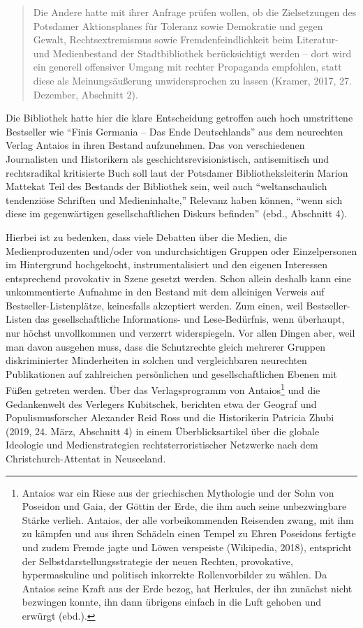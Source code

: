 \documentclass[a4paper,
fontsize=11pt,
oneside,
numbers=noperiodatend,
parskip=half-,
bibliography=totoc,
final
]{scrartcl}
\begin{document}
\begin{quote}
Die Andere hatte mit ihrer Anfrage prüfen wollen, ob die Zielsetzungen
des Potsdamer Aktionsplanes für Toleranz sowie Demokratie und gegen
Gewalt, Rechtsextremismus sowie Fremdenfeindlichkeit beim Literatur- und
Medienbestand der Stadtbibliothek berücksichtigt werden -- dort wird ein
generell offensiver Umgang mit rechter Propaganda empfohlen, statt diese
als Meinungsäußerung unwidersprochen zu lassen (Kramer, 2017, 27.
Dezember, Abschnitt 2).
\end{quote}

Die Bibliothek hatte hier die klare Entscheidung getroffen auch hoch
umstrittene Bestseller wie \enquote{Finis Germania -- Das Ende
Deutschlands} aus dem neurechten Verlag Antaios in ihren Bestand
aufzunehmen. Das von verschiedenen Journalisten und Historikern als
geschichtsrevisionistisch, antisemitisch und rechtsradikal kritisierte
Buch soll laut der Potsdamer Bibliotheksleiterin Marion Mattekat Teil
des Bestands der Bibliothek sein, weil auch \enquote{weltanschaulich
tendenziöse Schriften und Medieninhalte,} Relevanz haben können,
\enquote{wenn sich diese im gegenwärtigen gesellschaftlichen Diskurs
befinden} (ebd., Abschnitt 4).

Hierbei ist zu bedenken, dass viele Debatten über die Medien, die
Medienproduzenten und/oder von undurchsichtigen Gruppen oder
Einzelpersonen im Hintergrund hochgekocht, instrumentalisiert und den
eigenen Interessen entsprechend provokativ in Szene gesetzt werden.
Schon allein deshalb kann eine unkommentierte Aufnahme in den Bestand
mit dem alleinigen Verweis auf Bestseller-Listenplätze, keinesfalls
akzeptiert werden. Zum einen, weil Bestseller-Listen das
gesellschaftliche Informations- und Lese-Bedürfnis, wenn überhaupt, nur
höchst unvollkommen und verzerrt widerspiegeln. Vor allen Dingen aber,
weil man davon ausgehen muss, dass die Schutzrechte gleich mehrerer
Gruppen diskriminierter Minderheiten in solchen und vergleichbaren
neurechten Publikationen auf zahlreichen persönlichen und
gesellschaftlichen Ebenen mit Füßen getreten werden. Über das
Verlagsprogramm von Antaios\footnote{Antaios war ein Riese aus der
  griechischen Mythologie und der Sohn von Poseidon und Gaia, der Göttin
  der Erde, die ihm auch seine unbezwingbare Stärke verlieh. Antaios,
  der alle vorbeikommenden Reisenden zwang, mit ihm zu kämpfen und aus
  ihren Schädeln einen Tempel zu Ehren Poseidons fertigte und zudem
  Fremde jagte und Löwen verspeiste (Wikipedia, 2018), entspricht der
  Selbstdarstellungsstrategie der neuen Rechten, provokative,
  hypermaskuline und politisch inkorrekte Rollenvorbilder zu wählen. Da
  Antaios seine Kraft aus der Erde bezog, hat Herkules, der ihn zunächst
  nicht bezwingen konnte, ihn dann übrigens einfach in die Luft gehoben
  und erwürgt (ebd.).} und die Gedankenwelt des Verlegers Kubitschek,
berichten etwa der Geograf und Populismusforscher Alexander Reid Ross
und die Historikerin Patricia Zhubi (2019, 24. März, Abschnitt 4) in
einem Überblicksartikel über die globale Ideologie und Medienstrategien
rechtsterroristischer Netzwerke nach dem Christchurch-Attentat in
Neuseeland.
\end{document}
